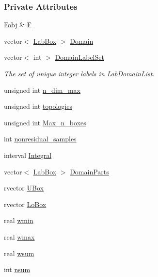 \subsubsection*{\-Private \-Attributes}
\begin{DoxyCompactItemize}
\item 
\hyperlink{classFobj}{\-Fobj} \& \hyperlink{classMRSampler_ab836cfbff1570a96b8af9c384226edfc}{\-F}
\item 
vector$<$ \hyperlink{classLabBox}{\-Lab\-Box} $>$ \hyperlink{classMRSampler_ab3c9a0e232b8145574c28989b9d25791}{\-Domain}
\item 
vector$<$ int $>$ \hyperlink{classMRSampler_a8497e118c2d180ff59884897ff97ff4d}{\-Domain\-Label\-Set}
\begin{DoxyCompactList}\small\item\em \-The set of unique integer labels in \-Lab\-Domain\-List. \end{DoxyCompactList}\item 
unsigned int \hyperlink{classMRSampler_afa30f614f3bf25d89990256e2e0c38bd}{n\-\_\-dim\-\_\-max}
\item 
unsigned int \hyperlink{classMRSampler_aa245fc901ea417e5b19f3e26c63cebad}{topologies}
\item 
unsigned int \hyperlink{classMRSampler_adf95f77ac86c63eef71474204ac28efc}{\-Max\-\_\-n\-\_\-boxes}
\item 
int \hyperlink{classMRSampler_a31a44287b73bf986bbddcf67245d3c9c}{nonresidual\-\_\-samples}
\item 
interval \hyperlink{classMRSampler_ada8a56adf645018f986090ca485049f5}{\-Integral}
\item 
vector$<$ \hyperlink{classLabBox}{\-Lab\-Box} $>$ \hyperlink{classMRSampler_aea43aaf9d80cae23dc971ab12d706ef8}{\-Domain\-Parts}
\item 
rvector \hyperlink{classMRSampler_ae15d963eb51af7923bdb0dc4a1784208}{\-U\-Box}
\item 
rvector \hyperlink{classMRSampler_a541ae11d9bfc46da67065796901740a4}{\-Lo\-Box}
\item 
real \hyperlink{classMRSampler_ad222a996bc96c32c89586628583be8bb}{wmin}
\item 
real \hyperlink{classMRSampler_af151b4e7e703ba21c87ae895c6b904f4}{wmax}
\item 
real \hyperlink{classMRSampler_aa569a3c7e50e947daddfe9766e6aa206}{wsum}
\item 
int \hyperlink{classMRSampler_ab82586caa232037dde75eba134f035ae}{nsum}
\item 

\end{DoxyCompactItemize}
